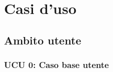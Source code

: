  \section{Casi d'uso}

\iffalse
\begin{itemize}
\item \textbf{Attori:} utente autenticato;
\item \textbf{Descrizione:}
\item \textbf{Precondizione:}
\item \textbf{Scenario principale:}\
\begin{enumerate}
\item
\end{enumerate}
\item \textbf{Postcondizione:}
\end{itemize}
\fi

\subsection{Ambito utente}

\subsubsection{UCU 0: Caso base utente }

